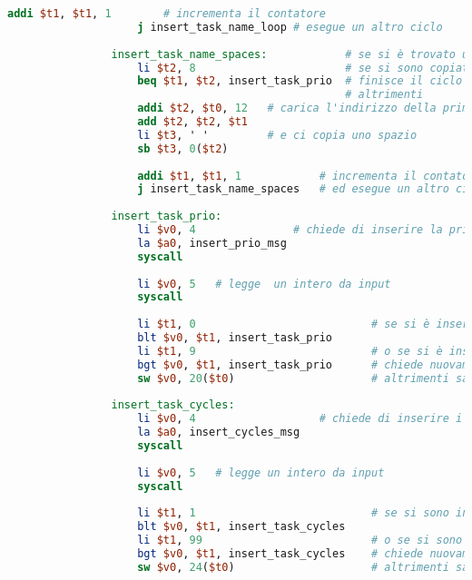 \begin{center}
\begin{lstlisting}[language=mips, gobble=14, stepnumber=1]
                    addi $t1, $t1, 1		# incrementa il contatore
                    j insert_task_name_loop	# esegue un altro ciclo
                    
                insert_task_name_spaces:			# se si è trovato un carattere speciale
                    li $t2, 8						# se si sono copiati 8 caratteri
                    beq $t1, $t2, insert_task_prio	# finisce il ciclo
                									# altrimenti
                    addi $t2, $t0, 12	# carica l'indirizzo della prima posizione del nome disponibile
                    add $t2, $t2, $t1
                    li $t3, ' '			# e ci copia uno spazio
                    sb $t3, 0($t2)
                	
                    addi $t1, $t1, 1			# incrementa il contatore
                    j insert_task_name_spaces	# ed esegue un altro ciclo
                    
                insert_task_prio:
                    li $v0, 4				# chiede di inserire la priorità del task
                    la $a0, insert_prio_msg
                    syscall
                    
                    li $v0, 5	# legge  un intero da input
                    syscall
                    
                    li $t1, 0                           # se si è inserita una priorità minore di 0
                    blt $v0, $t1, insert_task_prio
                    li $t1, 9                           # o se si è inserita una priorità maggiore di 9
                    bgt $v0, $t1, insert_task_prio      # chiede nuovamente la priorità del task
                    sw $v0, 20($t0)                     # altrimenti salva nell'heap
                    
                insert_task_cycles:
                    li $v0, 4					# chiede di inserire i cicli di esecuzione totali del task
                    la $a0, insert_cycles_msg
                    syscall
                    
                    li $v0, 5	# legge un intero da input
                    syscall
                    
                    li $t1, 1                           # se si sono inseriti meno di 1 ciclo
                    blt $v0, $t1, insert_task_cycles
                    li $t1, 99                          # o se si sono inseriti più di 99 cicli
                    bgt $v0, $t1, insert_task_cycles    # chiede nuovamente i cicli del task
                    sw $v0, 24($t0)                     # altrimenti salva nell'heap
                    

\end{lstlisting}
\end{center}
